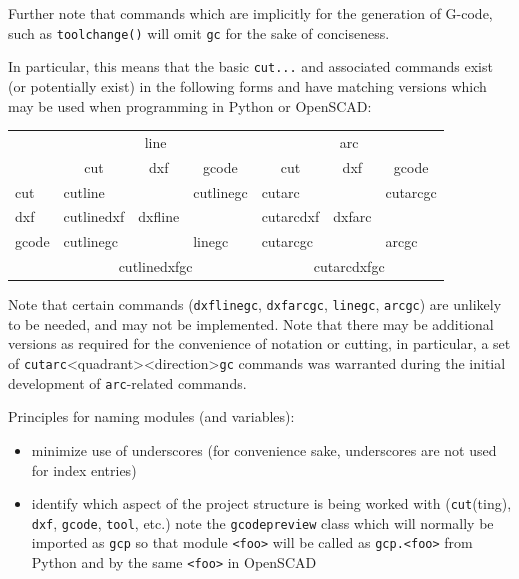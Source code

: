 \documentclass{ltxdoc}
\begin{document}
\noindent Further note that commands which are implicitly for the generation of G-code, such as \verb|toolchange()| will omit \verb|gc| for the sake of conciseness.

In particular, this means that the basic \verb|cut...| and associated commands exist (or potentially exist) in the following forms and have matching versions which may be used when programming in Python or OpenSCAD:

\bigskip

\noindent\begin{tabular}{lllllll}\toprule
& \multicolumn{3}{c}{line} & \multicolumn{3}{c}{arc}
\\\cmidrule(lr){2-4}\cmidrule(lr){5-7}
      & \multicolumn{1}{c}{cut}& \multicolumn{1}{c}{dxf}& \multicolumn{1}{c}{gcode}& \multicolumn{1}{c}{cut}& \multicolumn{1}{c}{dxf}& \multicolumn{1}{c}{gcode}\\\midrule
cut   & cutline\hphantom{dxf}  &                        &  cutlinegc               & cutarc\hphantom{dxf}   &                        & cutarcgc            \\
dxf   & cutlinedxf             & dxfline\hphantom{gc}   &                          & cutarcdxf              & dxfarc\hphantom{gc}    &                     \\
gcode & cutlinegc              & \hphantom{dxflinegc}   & linegc\hphantom{cut}     & cutarcgc               & \hphantom{dxfarcgc}    & arcgc\hphantom{cut} \\\cmidrule(ll){2-4}\cmidrule(ll){5-7}
& \multicolumn{3}{c}{cutlinedxfgc}                                         & \multicolumn{3}{c}{cutarcdxfgc}\\\bottomrule
\end{tabular}

\bigskip

\noindent Note that certain commands (\verb|dxflinegc|, \verb|dxfarcgc|, \verb|linegc|, \verb|arcgc|) are unlikely to be needed, and may not be implemented. Note that there may be additional versions as required for the convenience of notation or cutting, in particular, a set of \verb|cutarc|<quadrant><direction>\verb|gc| commands was warranted during the initial development of \verb|arc|-related commands.

Principles for naming modules (and variables):

\begin{itemize}
\item minimize use of underscores (for convenience sake, underscores are not used for index entries)
\item identify which aspect of the project structure is being worked with (\texttt{cut}(ting), 
      \texttt{dxf}, \texttt{gcode}, \texttt{tool}, etc.) note the \verb|gcodepreview| class which will 
      normally be imported as \verb|gcp| so that module \verb|<foo>| will be called as
      \verb|gcp.<foo>| from Python and by the same \verb|<foo>| in OpenSCAD
\end{itemize}
\end{document}
